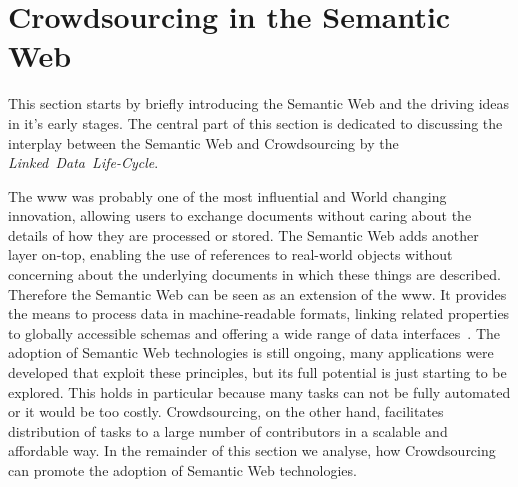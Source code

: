 

%
%
%
%
%
%
%
%
%
%
%
%
%

\section{Crowdsourcing in the Semantic Web}\label{sec:state_of_the_art_crowdsourcing_and_the_semantic_web}
This section starts by briefly introducing the Semantic Web and the driving ideas in it's early stages. The central part of this section is dedicated to discussing the interplay between the Semantic Web and Crowdsourcing by the \textit{Linked~Data~Life-Cycle}. 

The \gls{www} was probably one of the most influential and World changing innovation, allowing users to exchange documents without caring about the details of how they are processed or stored. The Semantic Web adds another layer on-top, enabling the use of references to real-world objects without concerning about the underlying documents in which these things are described. Therefore the Semantic Web can be seen as an extension of the \gls{www}. It provides the means to process data in machine-readable formats, linking related properties to globally accessible schemas and offering a wide range of data interfaces~\cite{hendler2010}.
The adoption of Semantic Web technologies is still ongoing, many applications were developed that exploit these principles, but its full potential is just starting to be explored. This holds in particular because many tasks can not be fully automated or it would be too costly. Crowdsourcing, on the other hand, facilitates distribution of tasks to a large number of contributors in a scalable and affordable way. In the remainder of this section we analyse, how Crowdsourcing can promote the adoption of Semantic Web technologies. 

